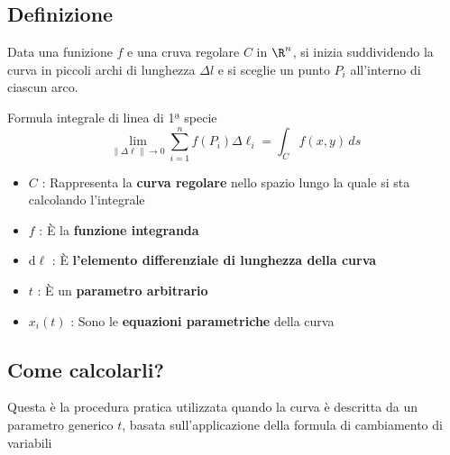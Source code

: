 \subsection{Definizione}
Data una funizione $f$ e una cruva regolare $C$ in $\R^n$, si inizia suddividendo la curva in piccoli archi di lunghezza $\Delta l$ e si sceglie un punto $P_i$ all'interno di ciascun arco.
\begin{center}
    \begin{definizione}{Formula integrale di linea di 1ª specie}
        $$
            \lim_{\|\Delta \ell\| \to 0} \sum_{i=1}^{n} f(P_i) \Delta \ell_i = \int_{C} f(x,y) \, ds
        $$
        \begin{itemize}
            \item $C$ : Rappresenta la \textbf{curva regolare} nello spazio lungo la quale si sta calcolando l'integrale
            \item $f$ : È la \textbf{funzione integranda}
            \item $\mathrm{d}\ell$ : È \textbf{l'elemento differenziale di lunghezza della curva}
            \item $t$ : È un \textbf{parametro arbitrario}
            \item $x_i(t)$ : Sono le \textbf{equazioni parametriche} della curva
        \end{itemize}
    \end{definizione}
\end{center}
\subsection{Come calcolarli?}
Questa è la procedura pratica utilizzata quando la curva è descritta da un parametro generico $t$, basata sull'applicazione della formula di cambiamento di variabili

\vspace{\baselineskip}

